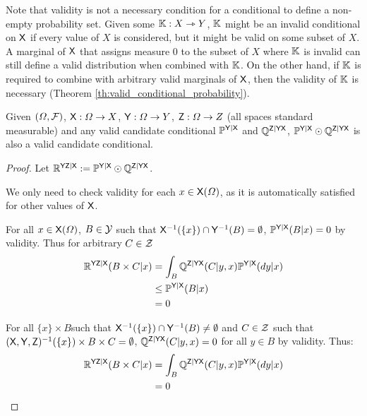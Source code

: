 Note that validity is not a necessary condition for a conditional to define a non-empty probability set. Given some $\mathbb{K}:X\rightarrowtriangle Y$, $\mathbb{K}$ might be an invalid conditional on $\mathsf{X}$ if every value of $X$ is considered, but it might be valid on some subset of $X$. A marginal of $\mathsf{X}$ that assigns measure 0 to the subset of $X$ where $\mathbb{K}$ is invalid can still define a valid distribution when combined with $\mathbb{K}$. On the other hand, if $\mathbb{K}$ is required to combine with arbitrary valid marginals of $\mathsf{X}$, then the validity of $\mathbb{K}$ is necessary (Theorem \ref{th:valid_conditional_probability}).

\begin{theorem}\label{lem:valid_extendability}
Given $(\Omega,\mathcal{F})$, $\mathsf{X}:\Omega\to X$, $\mathsf{Y}:\Omega\to Y$, $\mathsf{Z}:\Omega\to Z$ (all spaces standard measurable) and any valid candidate conditional $\mathbb{P}^{\mathsf{Y}|\mathsf{X}}$ and $\mathbb{Q}^{\mathsf{Z}|\mathsf{Y}\mathsf{X}}$, $ \mathbb{P}^{\mathsf{Y}|\mathsf{X}}\odot \mathbb{Q}^{\mathsf{Z}|\mathsf{Y}\mathsf{X}}$ is also a valid candidate conditional.
\end{theorem}

\begin{proof}
Let $\mathbb{R}^{\mathsf{YZ}|\mathsf{X}}:=\mathbb{P}^{\mathsf{Y}|\mathsf{X}}\odot \mathbb{Q}^{\mathsf{Z}|\mathsf{Y}\mathsf{X}}$.

We only need to check validity for each $x\in \mathsf{X}(\Omega)$, as it is automatically satisfied for other values of $\mathsf{X}$.

For all $x\in \mathsf{X}(\Omega)$, $B\in \mathcal{Y}$ such that $\mathsf{X}^{-1}( \{x\})\cap\mathsf{Y}^{-1}( B)=\emptyset$, $\mathbb{P}^{\mathsf{Y}|\mathsf{X}}(B|x)=0$ by validity. Thus for arbitrary $C\in \mathcal{Z}$
\begin{align}
    \mathbb{R}^{\mathsf{YZ}|\mathsf{X}}(B\times C|x) &= \int_B \mathbb{Q}^{\mathsf{Z}|\mathsf{YX}}(C|y,x)\mathbb{P}^{\mathsf{Y}|\mathsf{X}}(dy|x)\\
                                  &\leq \mathbb{P}^{\mathsf{Y}|\mathsf{X}}(B|x)\\
                                  &=0
\end{align}

For all $\{x\}\times B$such that $\mathsf{X}^{-1}( \{x\})\cap\mathsf{Y}^{-1}( B)\neq \emptyset$ and $C\in \mathcal{Z}$ such that $(\mathsf{X},\mathsf{Y},\mathsf{Z})^{-1} (\{x\})\times B\times C=\emptyset$, $\mathbb{Q}^{\mathsf{Z}|\mathsf{YX}}(C|y,x)=0$ for all $y\in B$ by validity. Thus:
\begin{align}
    \mathbb{R}^{\mathsf{YZ}|\mathsf{X}}(B\times C|x) &= \int_B \mathbb{Q}^{\mathsf{Z}|\mathsf{YX}}(C|y,x)\mathbb{P}^{\mathsf{Y}|\mathsf{X}}(dy|x)\\
                                            &=0
\end{align}
\end{proof}


